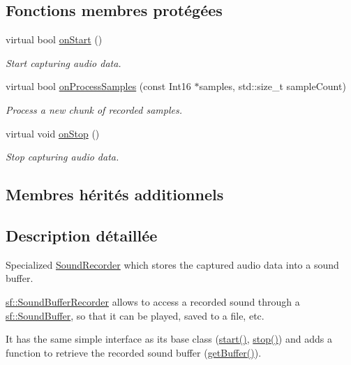 \subsection*{Fonctions membres protégées}
\begin{DoxyCompactItemize}
\item 
virtual bool \hyperlink{classsf_1_1SoundBufferRecorder_a531a7445fc8a48eaf9fc039c83f17c6f}{on\+Start} ()
\begin{DoxyCompactList}\small\item\em Start capturing audio data. \end{DoxyCompactList}\item 
virtual bool \hyperlink{classsf_1_1SoundBufferRecorder_a9ceb94de14632ae8c1b78faf603b4767}{on\+Process\+Samples} (const Int16 $\ast$samples, std\+::size\+\_\+t sample\+Count)
\begin{DoxyCompactList}\small\item\em Process a new chunk of recorded samples. \end{DoxyCompactList}\item 
\mbox{\label{classsf_1_1SoundBufferRecorder_ab8e53849312413431873a5869d509f1e}} 
virtual void \hyperlink{classsf_1_1SoundBufferRecorder_ab8e53849312413431873a5869d509f1e}{on\+Stop} ()
\begin{DoxyCompactList}\small\item\em Stop capturing audio data. \end{DoxyCompactList}\end{DoxyCompactItemize}
\subsection*{Membres hérités additionnels}


\subsection{Description détaillée}
Specialized \hyperlink{classsf_1_1SoundRecorder}{Sound\+Recorder} which stores the captured audio data into a sound buffer. 

\hyperlink{classsf_1_1SoundBufferRecorder}{sf\+::\+Sound\+Buffer\+Recorder} allows to access a recorded sound through a \hyperlink{classsf_1_1SoundBuffer}{sf\+::\+Sound\+Buffer}, so that it can be played, saved to a file, etc.

It has the same simple interface as its base class (\hyperlink{classsf_1_1SoundRecorder_a715f0fd2f228c83d79aaedca562ae51f}{start()}, \hyperlink{classsf_1_1SoundRecorder_a8d9c8346aa9aa409cfed4a1101159c4c}{stop()}) and adds a function to retrieve the recorded sound buffer (\hyperlink{classsf_1_1SoundBufferRecorder_aa3a8d7a612cb885ed2f58bb86aa24acb}{get\+Buffer()}).

